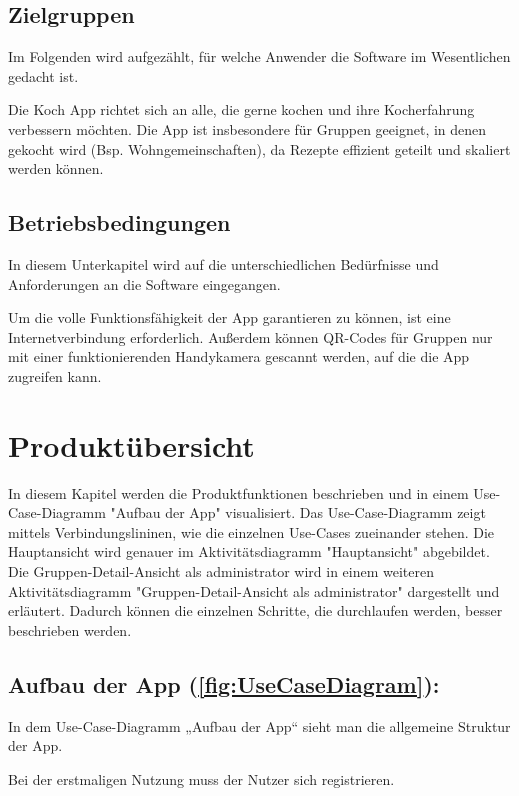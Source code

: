 \documentclass[parskip=full]{scrartcl}
\begin{document}
\subsection{Zielgruppen}
Im Folgenden wird aufgezählt, für welche Anwender die Software im Wesentlichen gedacht ist. \par
Die Koch App richtet sich an alle, die gerne kochen und ihre Kocherfahrung verbessern möchten.
Die App ist insbesondere für Gruppen geeignet, in denen gekocht wird (Bsp. Wohngemeinschaften), da Rezepte effizient geteilt und skaliert werden können.

\subsection{Betriebsbedingungen}
In diesem Unterkapitel wird auf die unterschiedlichen Bedürfnisse und Anforderungen an die Software eingegangen. \par
Um die volle Funktionsfähigkeit der App garantieren zu können, ist eine Internetverbindung erforderlich. Außerdem können QR-Codes für Gruppen nur mit einer funktionierenden Handykamera gescannt werden, auf die die App zugreifen kann.

\newpage
\section{Produktübersicht}

In diesem Kapitel werden die Produktfunktionen beschrieben und in einem Use-Case-Diagramm "Aufbau der App" visualisiert.
Das Use-Case-Diagramm zeigt mittels Verbindungslininen, wie die einzelnen Use-Cases zueinander stehen.
Die Hauptansicht wird genauer im Aktivitätsdiagramm "Hauptansicht" abgebildet.
Die Gruppen-Detail-Ansicht als \Gls{administrator} wird in einem weiteren Aktivitätsdiagramm "Gruppen-Detail-Ansicht als \Gls{administrator}" dargestellt und erläutert.
Dadurch können die einzelnen Schritte, die durchlaufen werden, besser beschrieben werden.\par


\subsection{Aufbau der App (\autoref{fig:UseCaseDiagram}):}

In dem Use-Case-Diagramm „Aufbau der App“ sieht man die allgemeine Struktur der App.

Bei der erstmaligen Nutzung muss der Nutzer sich registrieren.
\end{document}

